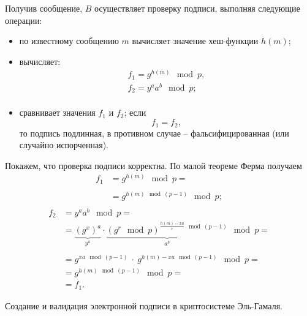 Получив сообщение, $B$ осуществляет проверку подписи, выполняя следующие операции:
\begin{itemize}
    \item по известному сообщению $m$ вычисляет значение хеш-функции $h(m)$;
    \item вычисляет:
        \[ \begin{array}{l}
            f_1 = g^{h(m)} \mod p, \\
            f_2 = y^a a^b \mod p; \\
        \end{array} \]
    \item сравнивает значения $f_1$ и $f_2$; если
        \[ f_1 = f_2, \]
        то подпись подлинная, в противном случае -- фальсифицированная (или случайно испорченная).
\end{itemize}

Покажем, что проверка подписи корректна. По малой теореме Ферма получаем
\[ \begin{array}{ll}
    f_1 & = g^{h(m)} \mod p = \\
    & \\
    & = g^{h(m) \mod (p-1)} \mod p; \\
\end{array} \] \[ \begin{array}{ll}
    f_2 & = y^a a^b \mod p = \\
    & = \underbrace{\left( g^x \right)^a}_{y^a} \cdot
        \underbrace{\left( g^r \mod p \right)^{\frac{h(m) - xa}{r} \mod (p-1)}}_{a^b} \mod p = \\
    & \\
    & = g^{xa \mod (p-1)} ~\cdot~ g^{h(m) - xa \mod (p-1)} \mod p = \\
    & = g^{h(m) \mod (p-1)} \mod p = \\
    & = f_1.
\end{array} \]

\example Создание и валидация электронной подписи в криптосистеме Эль-Гамаля.

